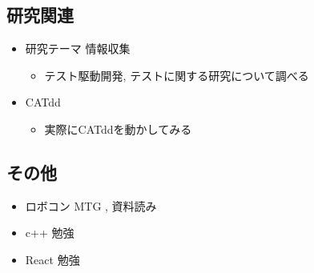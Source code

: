 \documentclass[uplatex, onecolumn, 10pt]{jsarticle}
\begin{document}
\subsection*{研究関連}
\begin{itemize}
	\item 研究テーマ 情報収集
		\begin{itemize}
			\item テスト駆動開発, テストに関する研究について調べる
		\end{itemize}
	\item CATdd 
		\begin{itemize}
			\item 実際にCATddを動かしてみる
		\end{itemize}
\end{itemize}

\subsection*{その他}
\begin{itemize}
    \item ロボコン MTG , 資料読み
    \item c++ 勉強
    \item React 勉強
\end{itemize}
\end{document}
